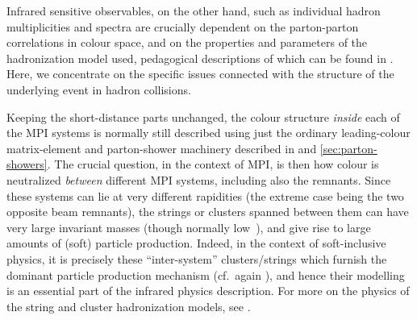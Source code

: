 Infrared sensitive observables, on the other hand, such as individual
hadron multiplicities and spectra are crucially dependent on the
parton-parton correlations in colour space, and on the properties and
parameters of the hadronization model used, pedagogical
descriptions of which can be found in .
Here, we concentrate on the specific issues connected with the
structure  of the underlying event in hadron collisions.

Keeping the short-distance parts unchanged, the colour structure
\emph{inside} each of the MPI systems is normally still described using
just the ordinary leading-colour matrix-element and parton-shower
machinery described in  and
\ref{sec:parton-showers}. The crucial question, in the context of MPI,
is then how colour is neutralized \emph{between} different MPI
systems, including also the remnants. Since these systems can lie at
very different rapidities (the extreme case being the two opposite
beam remnants), the strings or clusters spanned between them can have
very large invariant masses (though normally low~\pt),
and give rise to large amounts of (soft)
particle production. Indeed, in the context of soft-inclusive physics,
it is precisely these ``inter-system'' clusters/strings which furnish the
dominant particle production mechanism (cf.\ again
), and hence their modelling
is an essential part of the infrared physics description.
For more on
the physics of the string and cluster hadronization models, see
.

